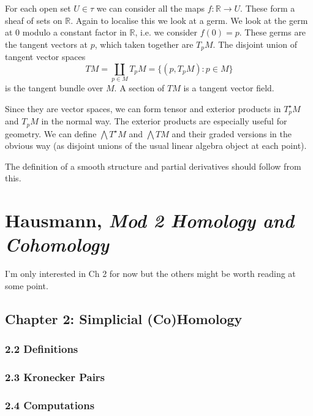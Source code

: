 \documentclass[oneside,english]{amsbook}
\numberwithin{section}{chapter}
\theoremstyle{plain}
\theoremstyle{definition}
\begin{document}
For each open set $U\in\tau$ we can consider all the maps  $f:\mathbb{R}\to U$. These form a sheaf of sets on $\mathbb{R}$. Again to localise this we look at a germ. We look at the germ at $0$ modulo a constant factor in $\mathbb{R}$, i.e. we consider $f(0)=p$. These germs are the tangent vectors at $p$, which taken together are $T_pM$. The disjoint union of tangent vector spaces
\[
	TM = \coprod_{p\in M}T_pM = \{(p, T_pM) : p\in M\}
\]
is the tangent bundle over $M$. A section of $TM$ is a tangent vector field.

Since they are vector spaces, we can form tensor and exterior products in $T^\star_pM$ and $T_pM$ in the normal way. The exterior products are especially useful for geometry. We can define $\bigwedge T^\star M$ and $\bigwedge TM$ and their graded versions in the obvious way (as disjoint unions of the usual linear algebra object at each point).

The definition of a smooth structure and partial derivatives  should follow from this.

\chapter{Hausmann, \emph{Mod 2 Homology and Cohomology}}

I'm only interested in Ch 2 for now but the others might be worth reading at some point.

\section{Chapter 2: Simplicial (Co)Homology}

\subsection{2.2 Definitions}

\subsection{2.3 Kronecker Pairs}

\subsection{2.4 Computations}
\end{document}

